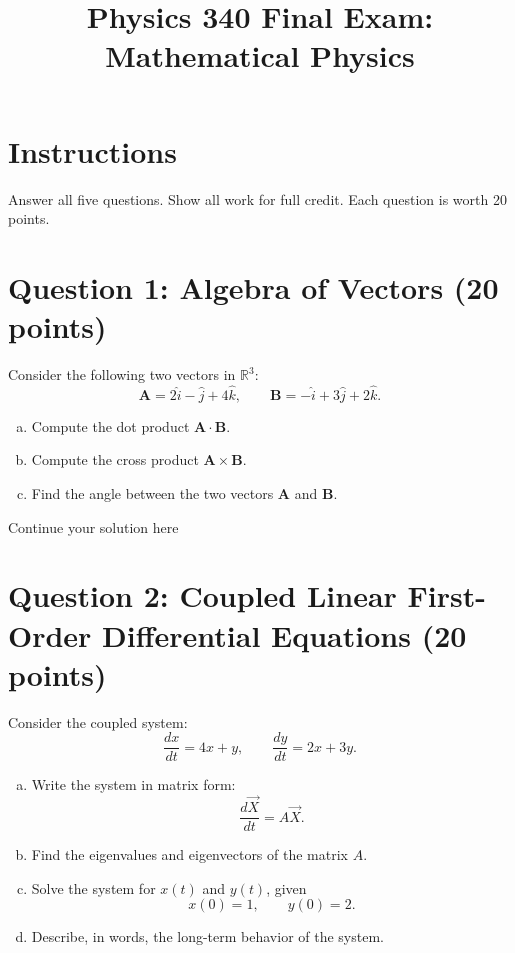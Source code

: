 \documentclass{article}
\begin{document}
\title{Physics 340 Final Exam: Mathematical Physics}
\author{}
\date{}
\maketitle

\section*{Instructions}
Answer all five questions. Show all work for full credit. Each question is worth 20 points.

\section*{Question 1: Algebra of Vectors (20 points)}

Consider the following two vectors in \( \mathbb{R}^3 \):
\[
\mathbf{A} = 2\hat{i} - \hat{j} + 4\hat{k}, 
\qquad
\mathbf{B} = -\hat{i} + 3\hat{j} + 2\hat{k}.
\]

\begin{enumerate}[a)]
\item Compute the dot product \( \mathbf{A}\cdot\mathbf{B} \).

\item Compute the cross product \( \mathbf{A}\times\mathbf{B} \).

\item Find the angle between the two vectors \( \mathbf{A} \) and \( \mathbf{B} \).
\end{enumerate}

\newpage
Continue your solution here
\vspace{4.0in}

\newpage

\section*{Question 2: Coupled Linear First-Order Differential Equations (20 points)}

Consider the coupled system:
\[
\frac{dx}{dt}=4x+y,
\qquad
\frac{dy}{dt}=2x+3y.
\]

\begin{enumerate}[a)]
\item Write the system in matrix form:
\[
\frac{d\vec{X}}{dt}=A\vec{X}.
\]

\item Find the eigenvalues and eigenvectors of the matrix \(A\).

\item Solve the system for \(x(t)\) and \(y(t)\), given
\[
x(0)=1,\qquad y(0)=2.
\]

\item Describe, in words, the long-term behavior of the system.
\end{enumerate}
\end{document}

